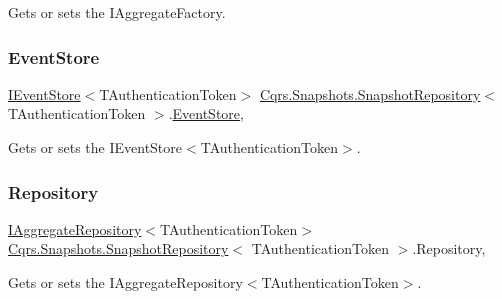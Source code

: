 Gets or sets the I\+Aggregate\+Factory. 

\mbox{\label{classCqrs_1_1Snapshots_1_1SnapshotRepository_a34f46341da207beab43bb96b20514976_a34f46341da207beab43bb96b20514976}} 
\subsubsection{\texorpdfstring{Event\+Store}{EventStore}}
{\footnotesize\ttfamily \hyperlink{interfaceCqrs_1_1Events_1_1IEventStore}{I\+Event\+Store}$<$T\+Authentication\+Token$>$ \hyperlink{classCqrs_1_1Snapshots_1_1SnapshotRepository}{Cqrs.\+Snapshots.\+Snapshot\+Repository}$<$ T\+Authentication\+Token $>$.\hyperlink{classCqrs_1_1Events_1_1EventStore}{Event\+Store}\hspace{0.3cm}{\ttfamily [get]}, {\ttfamily [protected]}}



Gets or sets the I\+Event\+Store$<$\+T\+Authentication\+Token$>$. 

\mbox{\label{classCqrs_1_1Snapshots_1_1SnapshotRepository_a64b1457cd45056fb7affd2aa8cd07d9e_a64b1457cd45056fb7affd2aa8cd07d9e}} 
\subsubsection{\texorpdfstring{Repository}{Repository}}
{\footnotesize\ttfamily \hyperlink{interfaceCqrs_1_1Domain_1_1IAggregateRepository}{I\+Aggregate\+Repository}$<$T\+Authentication\+Token$>$ \hyperlink{classCqrs_1_1Snapshots_1_1SnapshotRepository}{Cqrs.\+Snapshots.\+Snapshot\+Repository}$<$ T\+Authentication\+Token $>$.Repository\hspace{0.3cm}{\ttfamily [get]}, {\ttfamily [protected]}}



Gets or sets the I\+Aggregate\+Repository$<$\+T\+Authentication\+Token$>$. 

